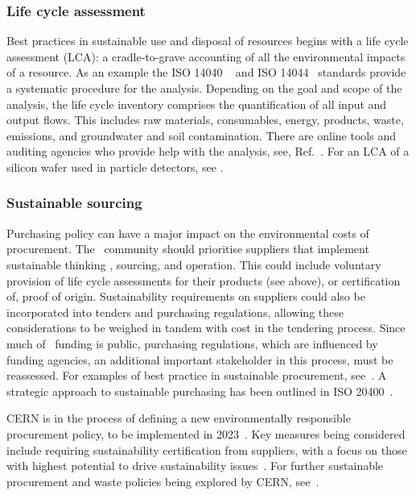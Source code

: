 \documentclass[../SustainableHEP.tex]{subfiles}
\begin{document}
\subsubsection{Life cycle assessment}

Best practices in sustainable use and disposal of resources begins with a life cycle assessment (LCA): a cradle-to-grave accounting of all the environmental impacts of a resource.  As an example the ISO 14040 ~\cite{ISO14040} and ISO 14044~\cite{ISO14044} standards provide a systematic procedure for the analysis. Depending on the goal and scope of the analysis, the life cycle inventory comprises the quantification of all input and output flows. This includes raw materials, consumables, energy, products, waste, emissions, and groundwater and soil contamination. There are online tools and auditing agencies who provide help with the analysis, see, \eg Ref.~\cite{ProBasSi}.  For an LCA of a silicon wafer used in particle detectors, see .

\subsubsection{Sustainable sourcing \label{sec:sustainablesourcing}}

Purchasing policy can have a major impact on the environmental costs of procurement. 
The \ACR\ community should prioritise suppliers that implement sustainable thinking , sourcing,  and operation. This could include voluntary provision of life cycle assessments for their products (see above), or certification of, \eg proof of origin.
Sustainability requirements on suppliers could also be incorporated into tenders and purchasing regulations, allowing these considerations to be weighed in tandem with cost in the tendering process.  Since much of \ACR\ funding is public, purchasing regulations, which are influenced by funding agencies, an additional important stakeholder in this process, must be reassessed.  For examples of best practice in sustainable procurement, see~.  A strategic approach to sustainable purchasing has been outlined in ISO 20400~\cite{ISO20400}.  

CERN is in the process of defining a new environmentally responsible procurement policy, to be implemented in 2023~\cite{Hartley}.  Key measures being considered include requiring sustainability certification from suppliers, with a focus on those with highest potential to drive sustainability issues~\cite{Hartley}.  For further sustainable procurement and waste policies being explored by CERN, see~.  
\end{document}
